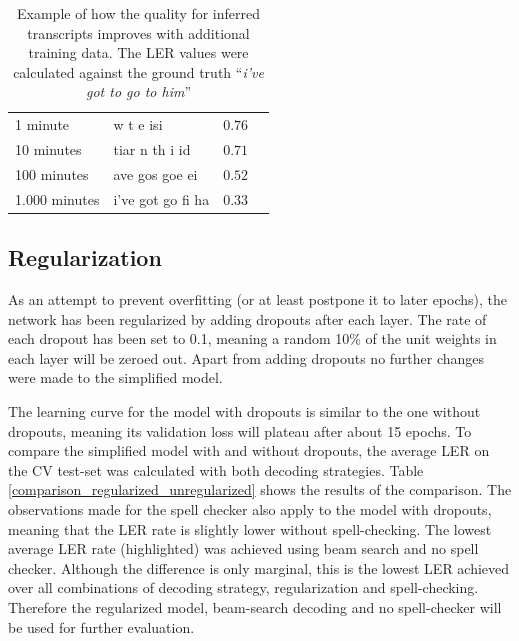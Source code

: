 \begin{table}[!htbp]
	\centering
	\begin{tabular}{llll}
		\toprule
		\thead{training data} & \thead{inferred transcript} & \thead{\ac{LER}} \\
		\midrule
		1 minute & w t e isi & $0.76$  \\ 	
		10 minutes & tiar n th i id & $0.71$  \\ 		
		100 minutes & ave gos goe ei & $0.52$  \\ 		
		1.000 minutes & i've got go fi ha & $0.33$  \\ 		
		\bottomrule
	\end{tabular}
	\caption{Example of how the quality for inferred transcripts improves with additional training data. The \ac{LER} values were calculated against the ground truth \foreignquote{french}{\textit{i've got to go to him}}}
	\label{training_progress}
\end{table}

\subsection{Regularization}
As an attempt to prevent overfitting (or at least postpone it to later epochs), the network has been regularized by adding dropouts after each layer. The rate of each dropout has been set to 0.1, meaning a random 10\% of the unit weights in each layer will be zeroed out. Apart from adding dropouts no further changes were made to the simplified model.

The learning curve for the model with dropouts is similar to the one without dropouts, meaning its validation loss will plateau after about 15 epochs. To compare the simplified model with and without dropouts, the average \ac{LER} on the \ac{CV} test-set was calculated with both decoding strategies. Table \ref{comparison_regularized_unregularized} shows the results of the comparison. The observations made for the spell checker also apply to the model with dropouts, meaning that the \ac{LER} rate is slightly lower without spell-checking. The lowest average \ac{LER} rate (highlighted) was achieved using beam search and no spell checker. Although the difference is only marginal, this is the lowest \ac{LER} achieved over all combinations of decoding strategy, regularization and spell-checking. Therefore the regularized model, beam-search decoding and no spell-checker will be used for further evaluation.

